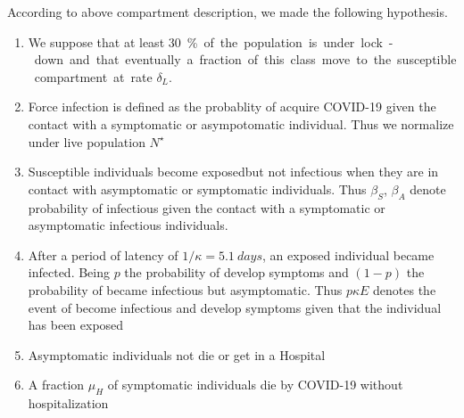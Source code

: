 \begin{hypotheses}
    According to above compartment description, we made the following
    hypothesis.
    \begin{enumerate}[(H-1)]
        \item
            We suppose that at least \SI{30}\percent  of the population is
            under lock-down and that eventually a fraction of this class move
            to the susceptible compartment at rate $\delta_L$.
        \item
            Force infection is defined as the probablity of acquire COVID-19
            given the contact with a symptomatic or asympotomatic individual.
            Thus we normalize under live population
            $
                N^{\star}
            $
        \item
            Susceptible individuals become
            exposed\textemdash but not infectious\textemdash
            when they are in contact with asymptomatic or symptomatic
            individuals. Thus $\beta_S$, $\beta_A$ denote
            probability of infectious given the contact with a symptomatic or
            asymptomatic infectious individuals.
        \item
            After a period of latency of $1/\kappa = \SI{5.1}{days}$, an
            exposed individual became infected. Being $p$ the probability of
            develop symptoms and $(1-p)$ the probability of became infectious
            but asymptomatic. Thus $p\kappa E$ denotes the
            event of become infectious and develop symptoms given that the
            individual has been exposed
        \item
            Asymptomatic individuals not die or get in a Hospital
        \item
            A fraction $\mu_{H}$ of symptomatic individuals
            die by COVID-19 without hospitalization
    \end{enumerate}
\end{hypotheses}




